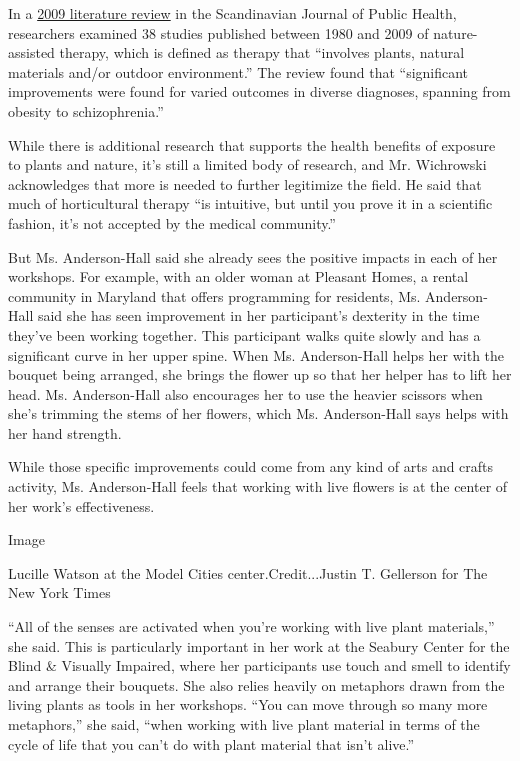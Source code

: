 In a \href{https://www.ncbi.nlm.nih.gov/pubmed/21273226}{2009 literature
review} in the Scandinavian Journal of Public Health, researchers
examined 38 studies published between 1980 and 2009 of nature-assisted
therapy, which is defined as therapy that ``involves plants, natural
materials and/or outdoor environment.'' The review found that
``significant improvements were found for varied outcomes in diverse
diagnoses, spanning from obesity to schizophrenia.''

While there is additional research that supports the health benefits of
exposure to plants and nature, it's still a limited body of research,
and Mr. Wichrowski acknowledges that more is needed to further
legitimize the field. He said that much of horticultural therapy ``is
intuitive, but until you prove it in a scientific fashion, it's not
accepted by the medical community.''

But Ms. Anderson-Hall said she already sees the positive impacts in each
of her workshops. For example, with an older woman at Pleasant Homes, a
rental community in Maryland that offers programming for residents, Ms.
Anderson-Hall said she has seen improvement in her participant's
dexterity in the time they've been working together. This participant
walks quite slowly and has a significant curve in her upper spine. When
Ms. Anderson-Hall helps her with the bouquet being arranged, she brings
the flower up so that her helper has to lift her head. Ms. Anderson-Hall
also encourages her to use the heavier scissors when she's trimming the
stems of her flowers, which Ms. Anderson-Hall says helps with her hand
strength.

While those specific improvements could come from any kind of arts and
crafts activity, Ms. Anderson-Hall feels that working with live flowers
is at the center of her work's effectiveness.

Image

Lucille Watson at the Model Cities center.Credit...Justin T. Gellerson
for The New York Times

``All of the senses are activated when you're working with live plant
materials,'' she said. This is particularly important in her work at the
Seabury Center for the Blind \& Visually Impaired, where her
participants use touch and smell to identify and arrange their bouquets.
She also relies heavily on metaphors drawn from the living plants as
tools in her workshops. ``You can move through so many more metaphors,''
she said, ``when working with live plant material in terms of the cycle
of life that you can't do with plant material that isn't alive.''

